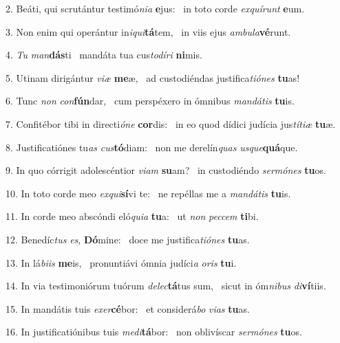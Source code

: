2. Beáti, qui scrutántur testimó\textit{ni}\textit{a} \textbf{e}jus: \ast\  in toto corde \textit{ex}\textit{quí}\textit{runt} \textbf{e}um.\

3. Non enim qui operántur in\textit{i}\textit{qui}\textbf{tá}tem, \ast\  in viis ejus \textit{am}\textit{bu}\textit{la}\textbf{vé}runt.\

4. \textit{Tu} \textit{man}\textbf{dás}ti \ast\  mandáta tua cus\textit{to}\textit{dí}\textit{ri} \textbf{ni}mis.\

5. Utinam dirigántur \textit{vi}\textit{æ} \textbf{me}æ, \ast\  ad custodiéndas justifica\textit{ti}\textit{ó}\textit{nes} \textbf{tu}as!\

6. Tunc \textit{non} \textit{con}\textbf{fún}dar, \ast\  cum perspéxero in ómnibus \textit{man}\textit{dá}\textit{tis} \textbf{tu}is.\

7. Confitébor tibi in directi\textit{ó}\textit{ne} \textbf{cor}dis: \ast\  in eo quod dídici judícia jus\textit{tí}\textit{ti}\textit{æ} \textbf{tu}æ.\

8. Justificatiónes tu\textit{as} \textit{cus}\textbf{tó}diam: \ast\  non me derelín\textit{quas} \textit{us}\textit{que}\textbf{quá}que.\

9. In quo córrigit adolescéntior \textit{vi}\textit{am} \textbf{su}am? \ast\  in custodiéndo \textit{ser}\textit{mó}\textit{nes} \textbf{tu}os.\

10. In toto corde meo \textit{ex}\textit{qui}\textbf{sí}vi te: \ast\  ne repéllas me a \textit{man}\textit{dá}\textit{tis} \textbf{tu}is.\

11. In corde meo abscóndi eló\textit{qui}\textit{a} \textbf{tu}a: \ast\  ut \textit{non} \textit{pec}\textit{cem} \textbf{ti}bi.\

12. Benedíc\textit{tus} \textit{es}, \textbf{Dó}mine: \ast\  doce me justifica\textit{ti}\textit{ó}\textit{nes} \textbf{tu}as.\

13. In lá\textit{bi}\textit{is} \textbf{me}is, \ast\  pronuntiávi ómnia judíci\textit{a} \textit{o}\textit{ris} \textbf{tu}i.\

14. In via testimoniórum tuórum \textit{de}\textit{lec}\textbf{tá}tus sum, \ast\  sicut in óm\textit{ni}\textit{bus} \textit{di}\textbf{ví}tiis.\

15. In mandátis tuis \textit{ex}\textit{er}\textbf{cé}bor: \ast\  et considerá\textit{bo} \textit{vi}\textit{as} \textbf{tu}as.\

16. In justificatiónibus tuis \textit{me}\textit{di}\textbf{tá}bor: \ast\  non oblivíscar \textit{ser}\textit{mó}\textit{nes} \textbf{tu}os.\


